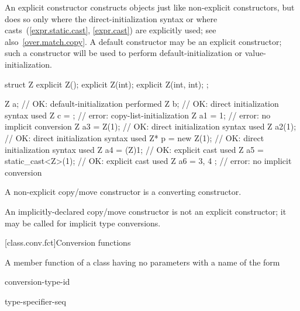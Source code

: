 \pnum
\begin{note}
An explicit constructor constructs objects just like non-explicit
constructors, but does so only where the direct-initialization syntax
or where casts~(\ref{expr.static.cast}, \ref{expr.cast}) are explicitly
used; see also~\ref{over.match.copy}.
A default constructor may be an explicit constructor; such a constructor
will be used to perform default-initialization
or value-initialization.
\begin{example}
\begin{codeblock}
struct Z {
  explicit Z();
  explicit Z(int);
  explicit Z(int, int);
};

Z a;                            // OK: default-initialization performed
Z b{};                          // OK: direct initialization syntax used
Z c = {};                       // error: copy-list-initialization
Z a1 = 1;                       // error: no implicit conversion
Z a3 = Z(1);                    // OK: direct initialization syntax used
Z a2(1);                        // OK: direct initialization syntax used
Z* p = new Z(1);                // OK: direct initialization syntax used
Z a4 = (Z)1;                    // OK: explicit cast used
Z a5 = static_cast<Z>(1);       // OK: explicit cast used
Z a6 = { 3, 4 };                // error: no implicit conversion
\end{codeblock}
\end{example}
\end{note}

\pnum
A non-explicit copy/move constructor is
a converting constructor.
\begin{note}
An implicitly-declared copy/move constructor is not an explicit constructor;
it may be called for implicit type conversions.
\end{note}

[class.conv.fct]{Conversion functions}%
%
%
%

\pnum
A member function of a class  having no parameters with a name of the form

\begin{bnf}
\br
     conversion-type-id
\end{bnf}

\begin{bnf}
\br
    type-specifier-seq 
\end{bnf}

